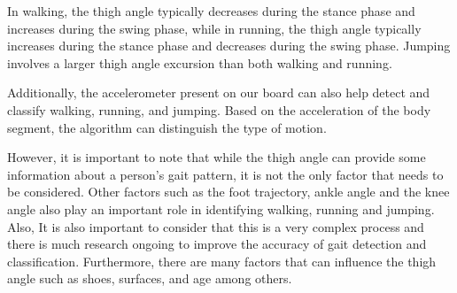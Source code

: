 In walking, the thigh angle typically decreases during the stance phase and increases during the swing phase, while in running, the thigh angle typically increases during the stance phase and decreases during the swing phase. Jumping involves a larger thigh angle excursion than both walking and running.

Additionally, the accelerometer present on our board can also help detect and classify walking, running, and jumping. Based on the acceleration of the body segment, the algorithm can distinguish the type of motion.

However, it is important to note that while the thigh angle can provide some information about a person's gait pattern, it is not the only factor that needs to be considered. Other factors such as the foot trajectory, ankle angle and the knee angle also play an important role in identifying walking, running and jumping. Also, It is also important to consider that this is a very complex process and there is much research ongoing to improve the accuracy of gait detection and classification. Furthermore, there are many factors that can influence the thigh angle such as shoes, surfaces, and age among others.




